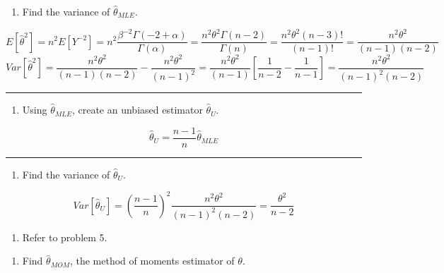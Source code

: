 \documentclass[12pt,]{article}
\providecommand{\tightlist}{%
  \setlength{\itemsep}{0pt}\setlength{\parskip}{0pt}}
\begin{document}
\begin{enumerate}
\def\labelenumi{\alph{enumi}.}
\setcounter{enumi}{2}
\tightlist
\item
  \textcolor[rgb]{0.5,0.5,0.5}{Find the variance of $\hat\theta_{MLE}$.}
\end{enumerate}

\[E[\hat\theta^2]=n^2E[Y^{-2}]=n^2\frac{\beta^{-2}\Gamma(-2+\alpha)}{\Gamma(\alpha)}=\frac{n^2\theta^2\Gamma(n-2)}{\Gamma(n)}=\frac{n^2\theta^2(n-3)!}{(n-1)!}=\frac{n^2\theta^2}{(n-1)(n-2)}\]
\[Var[\hat\theta^2]=\frac{n^2\theta^2}{(n-1)(n-2)}-\frac{n^2\theta^2}{(n-1)^2}=\frac{n^2\theta^2}{(n-1)}[\frac1{n-2}-\frac1{n-1}]=\frac{n^2\theta^2}{(n-1)^2(n-2)}\]

\begin{center}\rule{0.5\linewidth}{\linethickness}\end{center}

\begin{enumerate}
\def\labelenumi{\alph{enumi}.}
\setcounter{enumi}{3}
\tightlist
\item
  \textcolor[rgb]{0.5,0.5,0.5}{Using $\hat\theta_{MLE}$, create an unbiased estimator $\hat\theta_{U}$.}
\end{enumerate}

\[\hat\theta_{U}=\frac{n-1}{n}\hat\theta_{MLE}\]

\begin{center}\rule{0.5\linewidth}{\linethickness}\end{center}

\begin{enumerate}
\def\labelenumi{\alph{enumi}.}
\setcounter{enumi}{4}
\tightlist
\item
  \textcolor[rgb]{0.5,0.5,0.5}{Find the variance of $\hat\theta_{U}$.}
\end{enumerate}

\[Var[\hat\theta_{U}]=(\frac{n-1}{n})^2\frac{n^2\theta^2}{(n-1)^2(n-2)}=\frac{\theta^2}{n-2}\]

\begin{enumerate}
\def\labelenumi{\arabic{enumi}.}
\setcounter{enumi}{5}
\tightlist
\item
  \textcolor[rgb]{0.5,0.5,0.5}{Refer to problem 5.}
\end{enumerate}

\begin{enumerate}
\def\labelenumi{\alph{enumi}.}
\tightlist
\item
  \textcolor[rgb]{0.5,0.5,0.5}{Find $\hat\theta_{MOM}$, the method of moments estimator of $\theta$.}
\end{enumerate}
\end{document}
